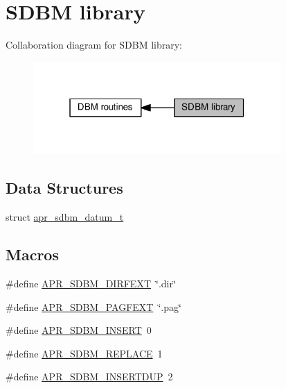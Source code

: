 \hypertarget{group__APR__Util__DBM__SDBM}{}\section{S\+D\+BM library}
\label{group__APR__Util__DBM__SDBM}
Collaboration diagram for S\+D\+BM library\+:
\nopagebreak
\begin{figure}[H]
\begin{center}
\leavevmode
\includegraphics[width=268pt]{group__APR__Util__DBM__SDBM}
\end{center}
\end{figure}
\subsection*{Data Structures}
\begin{DoxyCompactItemize}
\item 
struct \hyperlink{structapr__sdbm__datum__t}{apr\+\_\+sdbm\+\_\+datum\+\_\+t}
\end{DoxyCompactItemize}
\subsection*{Macros}
\begin{DoxyCompactItemize}
\item 
\#define \hyperlink{group__APR__Util__DBM__SDBM_gafabaf97932efa0eebfb1cc6b692a111f}{A\+P\+R\+\_\+\+S\+D\+B\+M\+\_\+\+D\+I\+R\+F\+E\+XT}~\char`\"{}.dir\char`\"{}
\item 
\#define \hyperlink{group__APR__Util__DBM__SDBM_gaa03fa1d1183240ca0845c54cc07df557}{A\+P\+R\+\_\+\+S\+D\+B\+M\+\_\+\+P\+A\+G\+F\+E\+XT}~\char`\"{}.pag\char`\"{}
\item 
\#define \hyperlink{group__APR__Util__DBM__SDBM_gad42d896bab08b5e210f489fa59656807}{A\+P\+R\+\_\+\+S\+D\+B\+M\+\_\+\+I\+N\+S\+E\+RT}~0
\item 
\#define \hyperlink{group__APR__Util__DBM__SDBM_ga84e2252c9ddf5e6c64ed1be43d2d0e53}{A\+P\+R\+\_\+\+S\+D\+B\+M\+\_\+\+R\+E\+P\+L\+A\+CE}~1
\item 
\#define \hyperlink{group__APR__Util__DBM__SDBM_ga64cd385609059cf151e54c7046d92ec3}{A\+P\+R\+\_\+\+S\+D\+B\+M\+\_\+\+I\+N\+S\+E\+R\+T\+D\+UP}~2
\end{DoxyCompactItemize}

